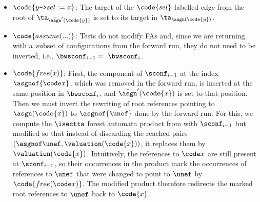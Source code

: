 \begin{itemize}
  \item $\code{y\text{\texttt{->}}sel := x}$:
The target of the $\code{sel}$-labelled edge from the root of
$\ta_{\bar\asgn'(\code{y})}$ is set to its target in $\ta_{\asgn(\code{y})}$.
 \item $\code{assume(...)}$: Tests do not modify FAs and, since we are returning
   with a~subset of configurations from the forward run, they do not need to be
    inverted, i.e., $\bwsconf_{i-1} =~\bwsconf_{i}$.
  \item $\code{free(x)}$:
First, the component of $\sconf_{i-1}$ at the index $\asgnof{\code x}$, which was
removed in the forward run, is inserted at the same position in $\bwsconf_{i}$, and
$\bar\asgn'(\code{x})$ is set to that position.
%
Then we must invert the rewriting of root references pointing to $\asgn(\code{x})$ to $\asgnof{\unef}$ done by the forward run.
For this, we compute the $\isectta$ forest automata product from  with $\sconf_{i-1}$ but modified so that 
instead of discarding the reached pairs $(\asgnof\unef,\valuation(\code{x}))$, 
it replaces them by $\valuation(\code{x})$.
%
Intuitively, the references to $\code x$ are still present at $\sconf_{i-1}$,
so their occurrences in the product mark the occurrences of references to $\unef$ 
that were changed to point to $\unef$ by $\code{free(\code x)}$. The modified product therefore 
redirects  
the marked root references to $\unef$ back to $\code{x}$.


\end{itemize}

